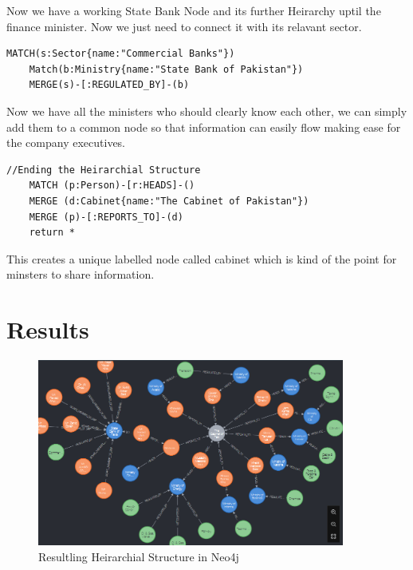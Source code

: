 \documentclass[12pt]{article}
\begin{document}
Now we have a working State Bank Node and its further Heirarchy uptil the finance minister. Now we just need to connect it with its relavant sector.

\begin{lstlisting}[frame=single]
    MATCH(s:Sector{name:"Commercial Banks"})
    Match(b:Ministry{name:"State Bank of Pakistan"})
    MERGE(s)-[:REGULATED_BY]-(b)
\end{lstlisting}

Now we have all the ministers who should clearly know each other, we can simply add them to a common node so that information can easily flow making ease for the company executives. 
\begin{lstlisting}[frame=single]
    //Ending the Heirarchial Structure
    MATCH (p:Person)-[r:HEADS]-()
    MERGE (d:Cabinet{name:"The Cabinet of Pakistan"})
    MERGE (p)-[:REPORTS_TO]-(d)
    return *
\end{lstlisting}

This creates a unique labelled node called cabinet which is kind of the point for minsters to share information.

\section{Results}

\begin{figure}
    \centering
    \includegraphics[width=0.9\textwidth]{Heirarchy.png} 
    \caption{Resultling Heirarchial Structure in Neo4j}
\end{figure}
\end{document}
